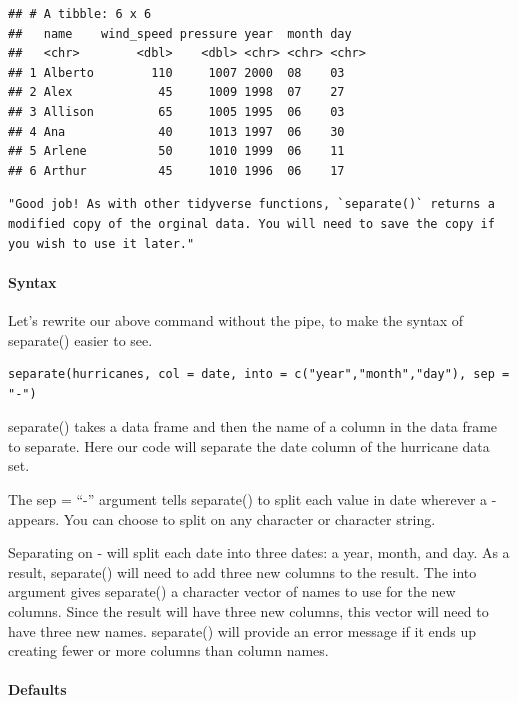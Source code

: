 \documentclass[
]{article}
\begin{document}
\begin{verbatim}
## # A tibble: 6 x 6
##   name    wind_speed pressure year  month day  
##   <chr>        <dbl>    <dbl> <chr> <chr> <chr>
## 1 Alberto        110     1007 2000  08    03   
## 2 Alex            45     1009 1998  07    27   
## 3 Allison         65     1005 1995  06    03   
## 4 Ana             40     1013 1997  06    30   
## 5 Arlene          50     1010 1999  06    11   
## 6 Arthur          45     1010 1996  06    17
\end{verbatim}

\begin{verbatim}
"Good job! As with other tidyverse functions, `separate()` returns a modified copy of the orginal data. You will need to save the copy if you wish to use it later."
\end{verbatim}

\hypertarget{syntax-1}{%
\paragraph{Syntax}\label{syntax-1}}

Let's rewrite our above command without the pipe, to make the syntax of
separate() easier to see.

\begin{verbatim}
separate(hurricanes, col = date, into = c("year","month","day"), sep = "-")
\end{verbatim}

separate() takes a data frame and then the name of a column in the data
frame to separate. Here our code will separate the date column of the
hurricane data set.

The sep = ``-'' argument tells separate() to split each value in date
wherever a - appears. You can choose to split on any character or
character string.

Separating on - will split each date into three dates: a year, month,
and day. As a result, separate() will need to add three new columns to
the result. The into argument gives separate() a character vector of
names to use for the new columns. Since the result will have three new
columns, this vector will need to have three new names. separate() will
provide an error message if it ends up creating fewer or more columns
than column names.

\hypertarget{defaults}{%
\paragraph{Defaults}\label{defaults}}
\end{document}
